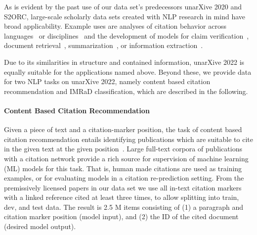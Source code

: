 As is evident by the past use of our data set's predecessors unarXive 2020 and S2ORC, large-scale scholarly data sets created with NLP research in mind have broad applicability. Example uses are analyses of citation behavior across languages~\cite{Saier2021} or disciplines~\cite{Veneri2022} and the development of models for claim verification~\cite{wadden2020}, document retrieval~\cite{Parisot2022}, summarization~\cite{citesum}, or information extraction~\cite{viswanathan2021}.

Due to its similarities in structure and contained information, unarXive 2022 is equally suitable for the applications named above. Beyond these, we provide data for two NLP tasks on unarXive 2022, namely content based citation recommendation and IMRaD classification, which are described in the following.

\paragraph{Content Based Citation Recommendation}
Given a piece of text and a citation-marker position, the task of content based citation recommendation entails identifying publications which are suitable to cite in the given text at the given position~\cite{Bhagavatula2018,Faerber2020a}. Large full-text corpora of publications with a citation network provide a rich source for supervision of machine learning (ML) models for this task. That is, human made citations are used as training examples, or for evaluating models in a citation re-prediction setting.
From the premissively licensed papers in our data set we use all in-text citation markers with a linked reference cited at least three times, to allow splitting into train, dev, and test data.
The result is 2.5 M items consisting of (1) a paragraph and citation marker position (model input), and (2) the ID of the cited document (desired model output). %

